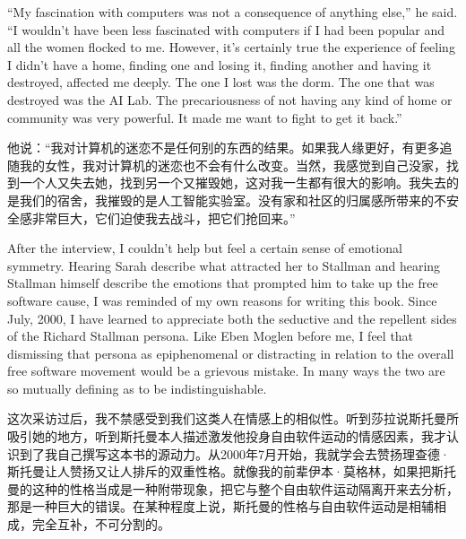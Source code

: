 \ifdefined\eng
``My fascination with computers was not a consequence of anything else,'' he said. ``I wouldn't have been less fascinated with computers if I had been popular and all the women flocked to me. However, it's certainly true the experience of feeling I didn't have a home, finding one and losing it, finding another and having it destroyed, affected me deeply. The one I lost was the dorm. The one that was destroyed was the AI Lab. The precariousness of not having any kind of home or community was very powerful. It made me want to fight to get it back.''
\fi

\ifdefined\chs
他说：``我对计算机的迷恋不是任何别的东西的结果。如果我人缘更好，有更多追随我的女性，我对计算机的迷恋也不会有什么改变。当然，我感觉到自己没家，找到一个人又失去她，找到另一个又摧毁她，这对我一生都有很大的影响。我失去的是我们的宿舍，我摧毁的是人工智能实验室。没有家和社区的归属感所带来的不安全感非常巨大，它们迫使我去战斗，把它们抢回来。''
\fi

\ifdefined\eng
After the interview, I couldn't help but feel a certain sense of emotional symmetry. Hearing Sarah describe what attracted her to Stallman and hearing Stallman himself describe the emotions that prompted him to take up the free software cause, I was reminded of my own reasons for writing this book. Since July, 2000, I have learned to appreciate both the seductive and the repellent sides of the Richard Stallman persona. Like Eben Moglen before me, I feel that dismissing that persona as epiphenomenal or distracting in relation to the overall free software movement would be a grievous mistake. In many ways the two are so mutually defining as to be indistinguishable.
\fi

\ifdefined\chs
这次采访过后，我不禁感受到我们这类人在情感上的相似性。听到莎拉说斯托曼所吸引她的地方，听到斯托曼本人描述激发他投身自由软件运动的情感因素，我才认识到了我自己撰写这本书的源动力。从2000年7月开始，我就学会去赞扬理查德·斯托曼让人赞扬又让人排斥的双重性格。就像我的前辈伊本·莫格林，如果把斯托曼的这种的性格当成是一种附带现象，把它与整个自由软件运动隔离开来去分析，那是一种巨大的错误。在某种程度上说，斯托曼的性格与自由软件运动是相辅相成，完全互补，不可分割的。
\fi



